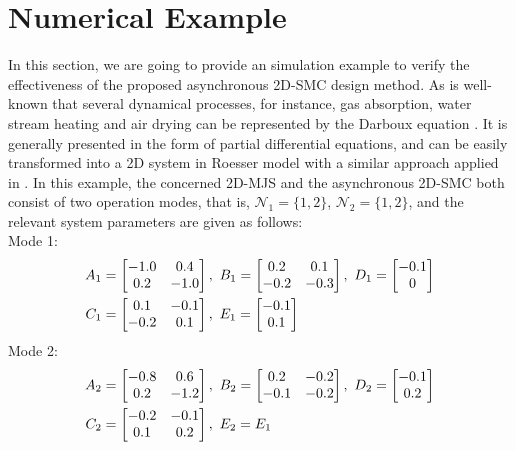 \documentclass[conference]{IEEEtran}
\begin{document}
\section{Numerical Example} \label{example}
In this section, we are going to provide an simulation example to verify the effectiveness of the proposed asynchronous 2D-SMC design method.  As is well-known that several dynamical processes, for instance, gas absorption,  water stream heating and air drying  can be represented by the Darboux equation \cite{darboux-equation}. It is generally presented in the form of partial differential equations, and can be easily transformed into  a 2D system in Roesser model with a similar approach applied in \cite{du-chunling&l-xie}. In this example, the concerned 2D-MJS and the asynchronous  2D-SMC both consist of two operation modes, that is, $\mathcal{N}_1=\{1,2\}$, $ \mathcal{N}_{2}=\{1,2\}$,  and the relevant system parameters are given as follows: \\
Mode 1:
\begin{equation} \notag
\begin{aligned}
	A_{1} &= \begin{bmatrix}
	-1.0&0.4\\
	0.2&-1.0
	\end{bmatrix}, \ 
	B_{1} = \begin{bmatrix}
	0.2&0.1\\ -0.2&-0.3
	\end{bmatrix} ,\ 
	D_{1} = \begin{bmatrix}
		-0.1\\0
	\end{bmatrix} \\
	C_{1} &= \begin{bmatrix}
		0.1&-0.1\\-0.2&0.1
	\end{bmatrix},\ 
	E_{1} = \begin{bmatrix}
		-0.1\\ 0.1
	\end{bmatrix}
\end{aligned}  
\end{equation}
Mode 2:
\begin{equation} \notag
\begin{aligned}
A_{2} &=\begin{bmatrix}
-0.8&0.6\\
0.2&-1.2
\end{bmatrix}, \ 
B_{2} = \begin{bmatrix}
0.2&-0.2\\ -0.1&-0.2
\end{bmatrix} ,\ 
D_{2} = \begin{bmatrix}
-0.1\\0.2
\end{bmatrix} \\
C_{2} &= \begin{bmatrix}
-0.2&-0.1\\0.1&0.2
\end{bmatrix},\
E_{2} = E_{1}
\end{aligned}  
\end{equation}
\end{document}

